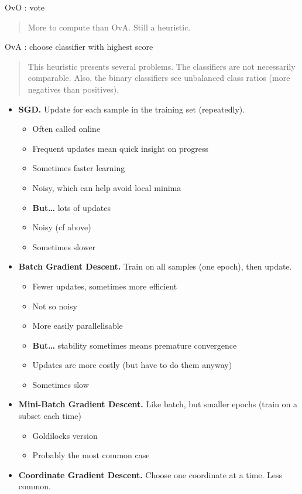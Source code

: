 
\usepackage{epsfig}






OvO : vote

\begin{quote}
  More to compute than OvA.  Still a heuristic.
\end{quote}

OvA : choose classifier with highest score

\begin{quote}
  This heuristic presents several problems.  The classifiers are not
  necessarily comparable.  Also, the binary classifiers see unbalanced
  class ratios (more negatives than positives).
\end{quote}


\begin{itemize}
\item \textbf{SGD.} Update for each sample in the training set
  (repeatedly).
  \begin{itemize}
  \item Often called online
  \item Frequent updates mean quick insight on progress
  \item Sometimes faster learning
  \item Noisy, which can help avoid local minima
  \item \textbf{But\dots} lots of updates
  \item Noisy (cf above)
  \item Sometimes slower
  \end{itemize}
\item \textbf{Batch Gradient Descent.} Train on all samples (one
  epoch), then update.
  \begin{itemize}
  \item Fewer updates, sometimes more efficient
  \item Not so noisy
  \item More easily parallelisable
  \item \textbf{But\dots} stability sometimes means premature
    convergence
  \item Updates are more costly (but have to do them anyway)
  \item Sometimes slow
  \end{itemize}
\item \textbf{Mini-Batch Gradient Descent.} Like batch, but smaller
  epochs (train on a subset each time)
  \begin{itemize}
  \item Goldilocks version
  \item Probably the most common case
  \end{itemize}
\item \textbf{Coordinate Gradient Descent.} Choose one coordinate at a
  time.  Less common.
\end{itemize}

